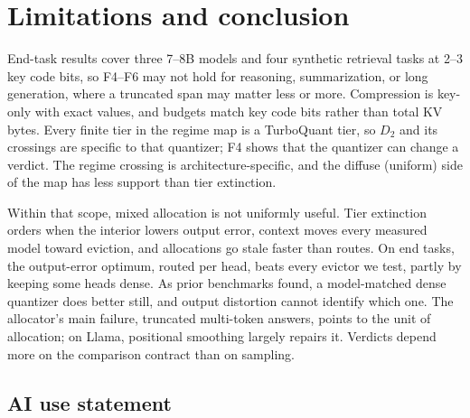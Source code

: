 \documentclass{article}
\theoremstyle{definition}
\begin{document}
\section{Limitations and conclusion}
\label{sec:conclusion}

End-task results cover three 7--8B models and four synthetic retrieval tasks at 2--3 key code bits,
so F4--F6 may not hold for reasoning, summarization, or long generation, where a truncated span may matter less or more.
Compression is key-only with exact values, and budgets match key code bits rather than total KV bytes. %
Every finite tier in the regime map is a TurboQuant tier, so $D_2$ and its crossings are specific to that quantizer; F4 shows that the quantizer can change a verdict.
The regime crossing is architecture-specific, and the diffuse (uniform) side of the map has less support than tier extinction.

Within that scope, mixed allocation is not uniformly useful.  Tier extinction orders when the interior lowers output error, context moves every measured model toward eviction, and allocations go stale faster than routes.
On end tasks, the output-error optimum, routed per head, beats every evictor we test, partly by keeping some heads dense.  As prior benchmarks found, a model-matched dense quantizer does better still, and output distortion cannot identify which one.
The allocator's main failure, truncated multi-token answers, points to the unit of allocation; on Llama, positional smoothing largely repairs it.  Verdicts depend more on the comparison contract than on sampling.

\label{main:end}

\subsection*{AI use statement}
\end{document}
